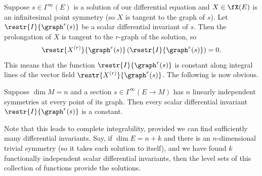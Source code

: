 Suppose $s\in\Gamma^\infty(E)$ is a solution of our differential equation and $X\in\fX(E)$ is an infinitesimal point symmetry (so $X$ is tangent to the graph of $s$). Let $\restr{I}{\graph^r(s)}$ be a scalar differential invariant of $s$. Then the prolongation of $X$ is tangent to the $r$-graph of the solution, so
\[\restr{X^{(r)}}{\graph^r(s)}\left(\restr{I}{\graph^r(s)}\right)=0.\]
This means that the function $\restr{I}{\graph^r(s)}$ is constant along integral lines of the vector field $\restr{X^{(r)}}{\graph^r(s)}$. The following is now obvious.

\begin{prop}
    Suppose $\dim M=n$ and a section $s\in\Gamma^\infty(E\to M)$ has $n$ linearly independent symmetries at every point of its graph. Then every scalar differential invariant $\restr{I}{\graph^r(s)}$ is a constant.
\end{prop}

Note that this leads to complete integrability, provided we can find sufficiently many differential invariants. Say, if $\dim E=n+k$ and there is an $n$-dimensional trivial symmetry (so it takes each solution to itself), and we have found $k$ functionally independent scalar differential invariants, then the level sets of this collection of functions provide the solutions.





